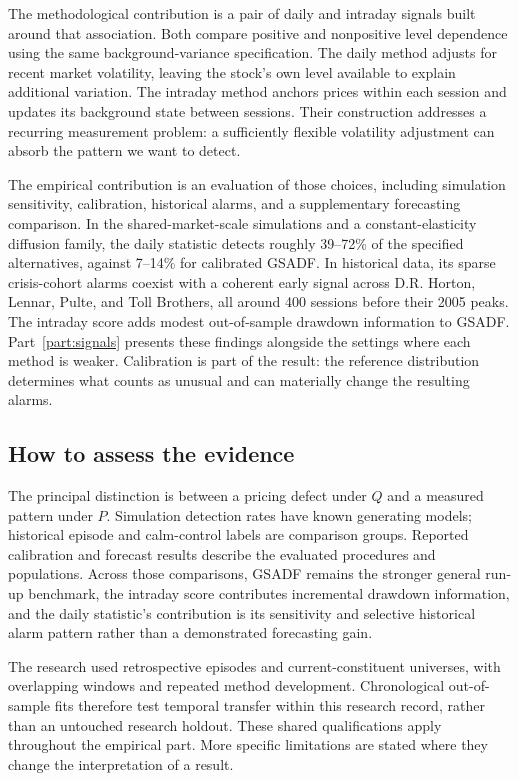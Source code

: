 The methodological contribution is a pair of daily and intraday signals
built around that association. Both compare positive and nonpositive level
dependence using the same background-variance specification. The daily
method adjusts for recent market volatility, leaving the stock's own level
available to explain additional variation. The intraday method anchors
prices within each session and updates its background state between
sessions. Their construction addresses a recurring measurement problem:
a sufficiently flexible volatility adjustment can absorb the pattern we
want to detect.

The empirical contribution is an evaluation of those choices, including
simulation sensitivity, calibration, historical alarms, and a supplementary
forecasting comparison. In the shared-market-scale simulations and a
constant-elasticity diffusion family, the daily statistic detects roughly
39--72\% of the specified alternatives, against 7--14\% for calibrated
GSADF. In historical data, its sparse crisis-cohort alarms coexist with a
coherent early signal across D.R. Horton, Lennar, Pulte, and Toll Brothers,
all around 400 sessions before their 2005 peaks. The intraday score adds
modest out-of-sample drawdown information to GSADF. Part~\ref{part:signals}
presents these findings alongside the settings where each method is weaker.
Calibration is part of the result: the reference distribution determines
what counts as unusual and can materially change the resulting alarms.

\subsection{How to assess the evidence}
The principal distinction is between a pricing defect under $Q$ and a
measured pattern under $P$. Simulation detection rates have known generating
models; historical episode and calm-control labels are comparison groups.
Reported calibration and forecast results describe the evaluated procedures
and populations. Across those comparisons, GSADF remains the stronger general
run-up benchmark, the intraday score contributes incremental drawdown
information, and the daily statistic's contribution is its sensitivity and
selective historical alarm pattern rather than a demonstrated forecasting
gain.

The research used retrospective episodes and current-constituent universes,
with overlapping windows and repeated method development. Chronological
out-of-sample fits therefore test temporal transfer within this research
record, rather than an untouched research holdout. These shared qualifications
apply throughout the empirical part. More specific limitations are stated
where they change the interpretation of a result.
